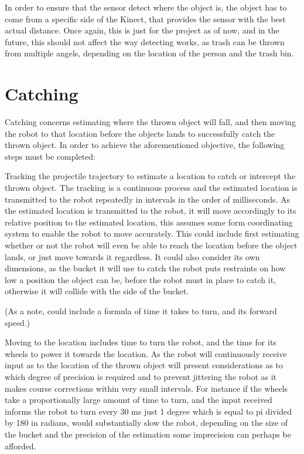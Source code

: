 In order to ensure that the sensor detect where the object is, the object has to come from a specific side of the Kinect, that provides the sensor with the best actual distance. Once again, this is just for the project as of now, and in the future, this should not affect the way detecting works, as trash can be thrown from multiple angels, depending on the location of the person and the trash bin.


\section{Catching}
\label{sec:catchingTheory}
Catching concerns estimating where the thrown object will fall, and then moving the robot to that location before the objects lands to successfully catch the thrown object. In order to achieve the aforementioned objective, the following steps must be completed:

Tracking the projectile trajectory to estimate a location to catch or intercept the thrown object. The tracking is a continuous process and the estimated location is transmitted to the robot repeatedly in intervals in the order of milliseconds. As the estimated location is transmitted to the robot, it will move accordingly to its relative position to the estimated location, this assumes some form coordinating system to enable the robot to move accurately. This could include first estimating whether or not the robot will even be able to reach the location before the object lands, or just move towards it regardless. It could also consider its own dimensions, as the bucket it will use to catch the robot puts restraints on how low a position the object can be, before the robot must in place to catch it, otherwise it will collide with the side of the bucket. 

(As a note, could include a formula of time it takes to turn, and its forward speed.)

Moving to the location includes time to turn the robot, and the time for its wheels to power it towards the location. As the robot will continuously receive input as to the location of the thrown object will present considerations as to which degree of precision is required and to prevent jittering the robot as it makes course corrections within very small intervals. For instance if the wheels take a proportionally large amount of time to turn, and the input received informs the robot to turn every 30 ms just 1 degree which is equal to pi divided by 180 in radians, would substantially slow the robot, depending on the size of the bucket and the precision of the estimation some imprecision can perhaps be afforded. 
